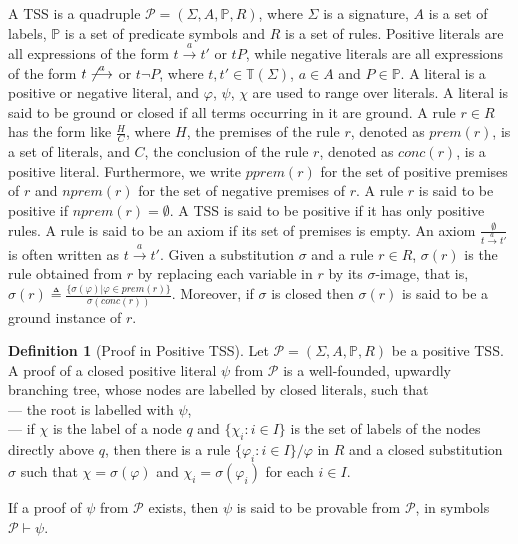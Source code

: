 \documentclass{elsarticle}
\theoremstyle{plain}
\theoremstyle{definition}
\newtheorem{mydefn}[theorem]{Definition}
\begin{document}
    A TSS is a quadruple $\mathcal{P}=(\Sigma,A,\mathbb{P},R)$, where $\Sigma$ is a signature, $A$ is a set of labels, $\mathbb P$ is a set of predicate symbols and $R$ is a set of rules.
    Positive literals are all expressions of the form $t \stackrel{a}{\longrightarrow} t'$ or $tP$, while negative literals are all expressions of the form $t \not\stackrel{a}{\longrightarrow}$ or $t\neg P$, where $t,t'\in \mathbb{T}(\Sigma )$, $a\in A$ and $P\in {\mathbb P}$.
A literal is a positive or negative literal, and $\varphi$, $\psi$, $\chi$ are used to range over literals.
    A literal is said to be ground or closed if all terms occurring in it are ground.
    A rule $r\in R$ has the form like $\frac{H}{C}$, where $H$, the premises of the rule $r$, denoted as $prem(r)$, is a set of literals, and $C$, the conclusion of the rule $r$, denoted as $conc(r)$, is a positive literal. Furthermore, we write $pprem(r)$ for the set of positive premises of $r$ and $nprem(r)$ for the set of negative premises of $r$. A rule $r$ is said to be positive if $nprem(r)= \emptyset$. A TSS is said to be  positive if it has only positive rules. A rule is said to be an axiom if its set of premises is empty. An axiom $\frac{\emptyset}{t \stackrel{a}{\longrightarrow} t'}$ is often written as $t \stackrel{a}{\longrightarrow} t'$.
    Given a substitution $\sigma$ and a rule $r \in R$, $\sigma(r)$ is the rule obtained from $r$ by replacing each variable in $r$ by its $\sigma$-image, that is, $\sigma(r) \triangleq \frac{\{\sigma(\varphi)|\varphi \in prem(r)\}}{\sigma(conc(r))}$.
    Moreover, if $\sigma$ is closed then $\sigma(r)$ is said to be a ground instance of $r$.



\begin{mydefn}[Proof in Positive TSS]
    Let $\mathcal{P}=(\Sigma,A,\mathbb{P},R)$ be a positive TSS. A proof of a closed positive literal $\psi$ from $\mathcal{P}$ is a well-founded, upwardly branching tree, whose nodes are labelled by closed literals, such that\\
    --- the root is labelled with $\psi$,\\
    --- if $\chi$ is the label of a node $q$ and $\{\chi_i:i\in I\}$ is the set of labels of the nodes directly above $q$, then there is a rule $\{\varphi_i:i \in I\} \slash \varphi$ in $R$ and a closed substitution $\sigma$ such that $\chi=\sigma(\varphi)$ and $\chi_i=\sigma(\varphi_i)$ for each $i \in I$.

    If a proof of $\psi$ from $\mathcal{P}$ exists, then $\psi$ is said to be provable from $\mathcal{P}$, in symbols $\mathcal{P}\vdash \psi$.
\end{mydefn}
\end{document}
